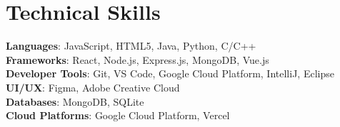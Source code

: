 \documentclass[letterpaper,11pt]{article}
\begin{document}
\section{Technical Skills}
 \begin{itemize}[leftmargin=0.15in, label={}]
    \small{\item{
     \textbf{Languages}{: JavaScript, HTML5, Java, Python, C/C++} \\
     \textbf{Frameworks}{: React, Node.js, Express.js, MongoDB, Vue.js} \\
     \textbf{Developer Tools}{: Git, VS Code, Google Cloud Platform, IntelliJ, Eclipse} \\
     \textbf{UI/UX}{: Figma, Adobe Creative Cloud} \\
     \textbf{Databases}{: MongoDB, SQLite} \\
     \textbf{Cloud Platforms}{: Google Cloud Platform, Vercel} \\
    }}
 \end{itemize}

\end{document}
